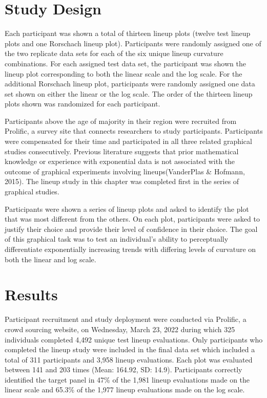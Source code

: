 \documentclass[print]{nuthesis}
\begin{document}
\hypertarget{study-design}{%
\section{Study Design}\label{study-design}}

Each participant was shown a total of thirteen lineup plots (twelve test lineup plots and one Rorschach lineup plot).
Participants were randomly assigned one of the two replicate data sets for each of the six unique lineup curvature combinations.
For each assigned test data set, the participant was shown the lineup plot corresponding to both the linear scale and the log scale.
For the additional Rorschach lineup plot, participants were randomly assigned one data set shown on either the linear or the log scale.
The order of the thirteen lineup plots shown was randomized for each participant.

Participants above the age of majority in their region were recruited from Prolific, a survey site that connects researchers to study participants.
Participants were compensated for their time and participated in all three related graphical studies consecutively.
Previous literature suggests that prior mathematical knowledge or experience with exponential data is not associated with the outcome of graphical experiments involving lineups(VanderPlas \& Hofmann, 2015).
The lineup study in this chapter was completed first in the series of graphical studies.

Participants were shown a series of lineup plots and asked to identify the plot that was most different from the others.
On each plot, participants were asked to justify their choice and provide their level of confidence in their choice.
The goal of this graphical task was to test an individual's ability to perceptually differentiate exponentially increasing trends with differing levels of curvature on both the linear and log scale.

\hypertarget{results}{%
\section{Results}\label{results}}

Participant recruitment and study deployment were conducted via Prolific, a crowd sourcing website, on Wednesday, March 23, 2022 during which 325 individuals completed 4,492 unique test lineup evaluations.
Only participants who completed the lineup study were included in the final data set which included a total of 311 participants and 3,958 lineup evaluations.
Each plot was evaluated between 141 and 203 times (Mean: 164.92, SD: 14.9).
Participants correctly identified the target panel in 47\% of the 1,981 lineup evaluations made on the linear scale and 65.3\% of the 1,977 lineup evaluations made on the log scale.
\end{document}
